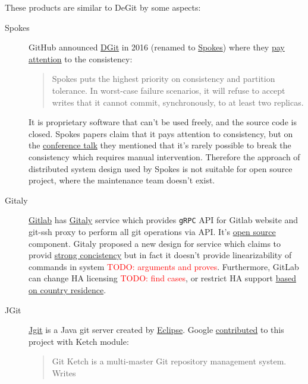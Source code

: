 \documentclass[acmlarge, screen, nonacm, 11pt]{acmart}
\newcommand{\code}[1]{\texttt{#1}}
\newcommand{\todo}[1]{\textcolor{red}{TODO: #1}}
\begin{document}
These products are similar to DeGit by some aspects:
\begin{description}
  \item[Spokes]
    GitHub announced \href{https://github.blog/2016-04-05-introducing-dgit/}{DGit}
    in 2016 (renamed to \href{https://github.blog/2016-09-07-building-resilience-in-spokes/}{Spokes})
    where they \href{https://github.blog/2016-09-07-building-resilience-in-spokes/#defining-resilience}{pay attention}
    to the consistency:
    \begin{quote}
      Spokes puts the highest priority on consistency and partition tolerance.
      In worst-case failure scenarios, it will refuse to accept writes that it cannot commit,
      synchronously, to at least two replicas.
    \end{quote}
     It is proprietary software that can't be used freely, and the source code is closed.
    Spokes papers claim that it pays attention to consistency, but on the
    \href{https://www.youtube.com/watch?v=DY0yNRNkYb0}{conference talk} they mentioned that
    it's rarely possible to break the consistency which requires manual intervention.
    Therefore the approach of distributed system design used by Spokes is not suitable for open
    source project, where the maintenance team doesn't exist.
  \item[Gitaly]
    \href{https://docs.gitlab.com/ee/README.html}{Gitlab} has
    \href{https://docs.gitlab.com/ee/administration/gitaly/}{Gitaly} service which provides
    \code{gRPC} API for Gitlab website and git-ssh proxy to perform all git operations via API.
    It's \href{https://gitlab.com/gitlab-org/gitaly}{open source} component.
    Gitaly proposed a new design for service which claims to provid
    \href{https://gitlab.com/gitlab-org/gitaly/-/blob/master/doc/design\_ha.md\#strong-consistency-design}{strong concistency}
    but in fact it doesn't provide linearizability of commands in system \todo{arguments and proves}.
    Furthermore, GitLab can change HA licensing \todo{find cases},
    or restrict HA support \href{https://news.ycombinator.com/item?id=21437334}{based on country residence}.
  \item[JGit]
    \href{https://www.eclipse.org/jgit/}{Jgit} is a Java git server created by \href{https://www.eclipse.org/}{Eclipse}.
    Google \href{https://www.eclipse.org//lists/jgit-dev/msg03073.html}{contributed} to this project with Ketch module:
    \begin{quote}
      Git Ketch is a multi-master Git repository management system. Writes

\end{quote}
\end{description}
\end{document}

